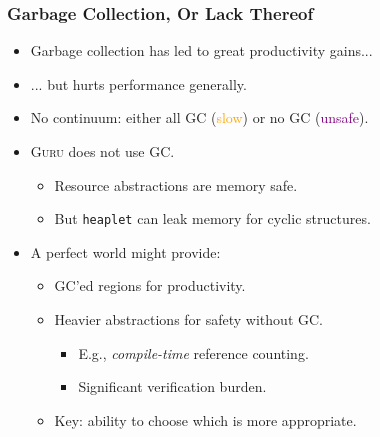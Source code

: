 \documentclass[10pt]{beamer}
\begin{document}
\begin{frame}
\frametitle{Garbage Collection, Or Lack Thereof}
\begin{itemize}
\item Garbage collection has led to great productivity gains...
\item ... but hurts performance generally.
\item No continuum: either all GC (\textcolor{orange}{slow}) or no GC (\textcolor{purple}{unsafe}).
\item \textsc{Guru} does not use GC.
\begin{itemize}
\item Resource abstractions are memory safe.
\item But \texttt{heaplet} can leak memory for cyclic structures.
\end{itemize}
\item A perfect world might provide:
\begin{itemize}
\item GC'ed regions for productivity.
\item Heavier abstractions for safety without GC.
\begin{itemize}
\item E.g., \emph{compile-time} reference counting.
\item Significant verification burden.
\end{itemize}
\item Key: ability to choose which is more appropriate.
\end{itemize}
\end{itemize}
\end{frame}
\end{document}
